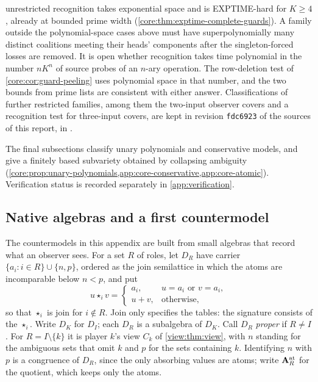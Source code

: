 unrestricted recognition takes exponential space and is EXPTIME-hard
for $K\ge4$, already at bounded prime width
(\cref{core:thm:exptime-complete-guards}). A family outside the polynomial-space cases above
must have superpolynomially many distinct coalitions meeting their
heads' components after the singleton-forced losses are removed.
It is open whether recognition takes time polynomial in the number
$nK^n$ of source probes of an $n$-ary operation. The row-deletion test
of \cref{core:cor:guard-peeling} uses polynomial space in that number,
and the two bounds from prime lists are consistent with either answer.
Classifications of further restricted families, among them the two-input
observer covers and a recognition test for three-input covers, are kept
in revision \texttt{fdc6923} of the sources of this report, in
.

The final subsections classify unary polynomials and conservative models,
and give a finitely based subvariety obtained by collapsing ambiguity
(\cref{core:prop:unary-polynomials,app:core-conservative,app:core-atomic}).
Verification status is recorded separately in \cref{app:verification}.

\subsection{Native algebras and a first countermodel}
\label{app:core-native}

The countermodels in this appendix are built from small algebras that
record what an observer sees. For a set $R$ of roles, let $D_R$ have carrier
$\{a_i:i\in R\}\cup\{n,p\}$, ordered as the join semilattice in which the
atoms are incomparable below $n<p$, and put
\[
 u\star_i v=
 \begin{cases}
 a_i,&u=a_i\text{ or }v=a_i,\\
 u+v,&\text{otherwise},
 \end{cases}
\]
so that $\star_i$ is join for $i\notin R$. Join only specifies the tables:
the signature consists of the $\star_i$. Write $D_K$ for $D_I$; each $D_R$
is a subalgebra of $D_K$. Call $D_R$ \emph{proper} if $R\ne I$. For
$R=I\setminus\{k\}$ it is player $k$'s view $C_k$ of \cref{view:thm:view},
with $n$ standing for the ambiguous sets that omit $k$ and $p$ for the sets
containing $k$.
Identifying $n$ with $p$ is a congruence of $D_R$, since the only absorbing
values are atoms; write $\mathbf A_R^{\rm at}$ for the quotient, which keeps
only the atoms.

